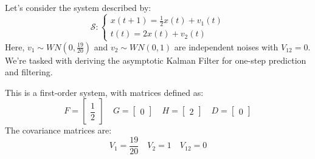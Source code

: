 \begin{example}
    Let's consider the system described by:
    \[\mathcal{S}:\begin{cases}
        x(t+1)=\frac{1}{2}x(t)+v_1(t) \\
        t(t)=2x(t)+v_2(t)
    \end{cases}\]
    Here, $v_1\sim WN(0,\frac{19}{20})$ and $v_2\sim WN(0,1)$ are independent noises with $V_{12}=0$. 
    We're tasked with deriving the asymptotic Kalman Filter for one-step prediction and filtering.

    This is a first-order system, with matrices defined as:
    \[F=\begin{bmatrix} \dfrac{1}{2} \end{bmatrix} \quad G=\begin{bmatrix} 0 \end{bmatrix} \quad H=\begin{bmatrix} 2 \end{bmatrix} \quad D=\begin{bmatrix} 0 \end{bmatrix} \]
    The covariance matrices are:
    \[V_1=\frac{19}{20} \quad V_2=1 \quad V_{12}=0\]


\end{example}
